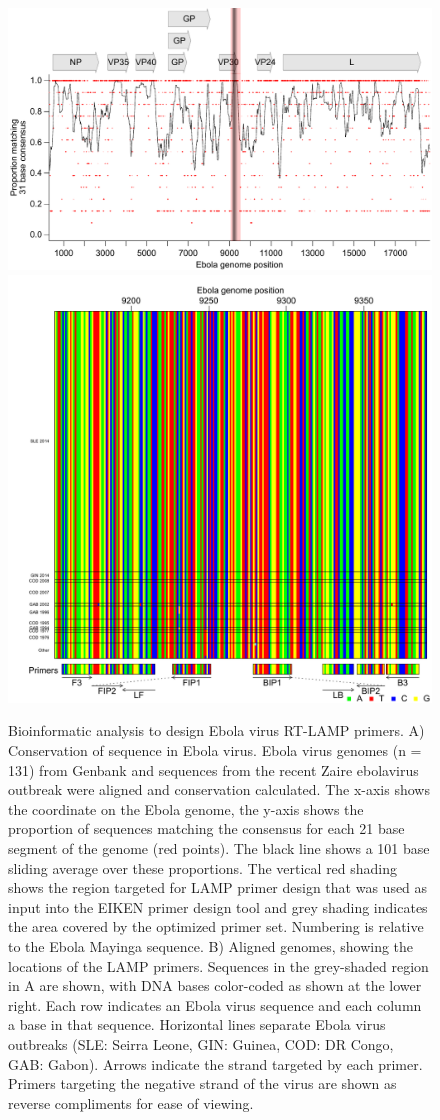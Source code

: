 \documentclass[../sherrill-Mix_thesis.tex]{subfiles}
\begin{document}
	\begin{figure}
		\centering
		\includegraphics[width=.6\textwidth]{ebolaConsensus.pdf} %
		\includegraphics[width=.6\textwidth]{loop_bases.pdf} %
		\caption[Ebola RT-LAMP primers design]{Bioinformatic analysis to design Ebola virus RT-LAMP primers. A) Conservation of sequence in Ebola virus. Ebola virus genomes (n = 131) from Genbank and sequences from the recent Zaire ebolavirus outbreak \citep{Gire2014} were aligned and conservation calculated. The x-axis shows the coordinate on the Ebola genome, the y-axis shows the proportion of sequences matching the consensus for each 21 base segment of the genome (red points). The black line shows a 101 base sliding average over these proportions. The vertical red shading shows the region targeted for LAMP primer design that was used as input into the EIKEN primer design tool and grey shading indicates the area covered by the optimized primer set. Numbering is relative to the Ebola Mayinga sequence. B) Aligned genomes, showing the locations of the LAMP primers. Sequences in the grey-shaded region in A are shown, with DNA bases color-coded as shown at the lower right. Each row indicates an Ebola virus sequence and each column a base in that sequence. Horizontal lines separate Ebola virus outbreaks (SLE: Seirra Leone, GIN: Guinea, COD: DR Congo, GAB: Gabon). Arrows indicate the strand targeted by each primer. Primers targeting the negative strand of the virus are shown as reverse compliments for ease of viewing.}
		\label{figEbolaConsensus}
	\end{figure}
\end{document}
